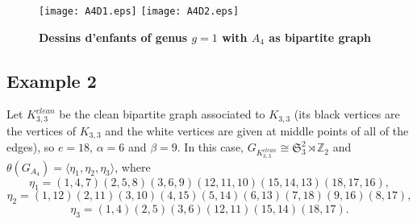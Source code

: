 \documentclass[12pt]{amsart}
\theoremstyle{remark}
\begin{document}
\begin{figure}[htbp]
\begin{center}
\texttt{[image: A4D1.eps]}
\texttt{[image: A4D2.eps]}
\caption{{\bf Dessins d'enfants of genus $g=1$ with $A_4$ as bipartite graph}}
\label{FigD1}
\end{center}
\end{figure}

\subsection{Example 2}\label{ejemplo2}
Let $K_{3,3}^{clean}$ be the clean bipartite graph associated to $K_{3,3}$ (its black vertices are the vertices of $K_{3,3}$ and the white vertices are given at middle points of all of the edges), so $e=18$, $\alpha=6$ and $\beta=9$. In this case, $G_{K_{3,3}^{clean}}\cong {\mathfrak S}_{3}^{2} \rtimes {\mathbb Z}_{2}$ and $\theta(G_{A_{4}})=\langle \eta_{1}, \eta_{2}, \eta_{3} \rangle$,
where $$\eta_{1}=(1,4,7)(2,5,8)(3,6,9)(12,11,10)(15,14,13)(18,17,16),$$
$$\eta_{2}=(1,12)(2,11)(3,10)(4,15)(5,14)(6,13)(7,18)(9,16)(8,17),$$
$$\eta_{3}=(1,4)(2,5)(3,6)(12,11)(15,14)(18,17).$$
\end{document}
